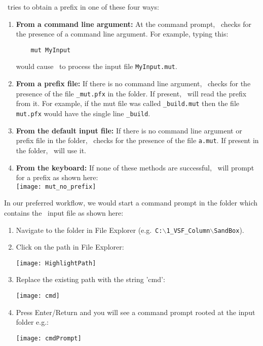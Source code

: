 \mut\ tries to obtain a prefix in one of these four ways:
\begin{enumerate}
    \item \textbf{From a command line argument:} \label{commarg} At the command prompt, \mut\ checks for the presence of a command line argument.  For example, typing this:
\begin{verbatim}
    mut MyInput
\end{verbatim}
        would cause \mut\ to process the input file \texttt{MyInput.mut}.
    \item \textbf{From a prefix file:} If there is no command line argument, \mut\ checks for the presence of the file \texttt{\_mut.pfx} in the folder.  If present, \mut\ will read the prefix from it. For example, if the mut file was called \texttt{\_build.mut} then the file \texttt{mut.pfx} would have the single line \texttt{\_build}.
    \item \textbf{From the default input file:} If there is no command line argument or prefix file in the folder, \mut\ checks for the presence of the file \texttt{a.mut}.  If present in the folder, \mut\ will use it.
    \item \textbf{From the keyboard:} If none of these methods are successful, \mut\ will prompt for a prefix as shown here:
        \vspace{.2in} \\
        \texttt{[image: mut\_no\_prefix]}
        \vspace{.2in} \\
\end{enumerate}

 In our preferred workflow, we would start a command prompt in the folder which contains the \mut\ input file as shown here:
\begin{enumerate}
    \item  Navigate to the folder in File Explorer (e.g.\ \texttt{C:$\backslash$1\_VSF\_Column\-$\backslash$SandBox}).
   \item  Click on the path in File Explorer:

        \texttt{[image: HighlightPath]}

    \item  Replace the existing path with the string 'cmd':

        \texttt{[image: cmd]}

    \item Press Enter/Return and you will see a command prompt rooted at the input folder e.g.:

        \texttt{[image: cmdPrompt]}

\end{enumerate}

